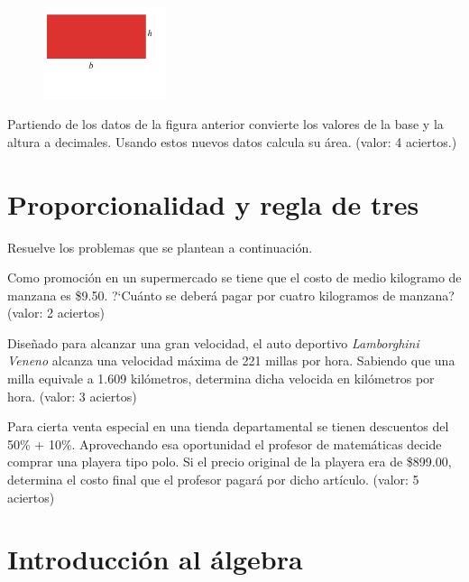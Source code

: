 \documentclass[11pt]{article}
\begin{document}
\begin{figure}[h!]
        \includegraphics[width=0.32\textwidth]{./rectangulo}
    \label{fig:rectangulo}
\end{figure}

\newpage

Partiendo de los datos de la figura anterior convierte los valores de la base y
la altura a decimales. Usando estos nuevos datos calcula su \'area. (valor: 4
aciertos.)

\vspace{5cm}

\section{Proporcionalidad y regla de tres}

Resuelve los problemas que se plantean a continuaci\'on.

\vspace{0.5cm}

Como promoci\'on en un supermercado se tiene que el costo de medio kilogramo de
manzana es \$9.50. ?`Cu\'anto se deber\'a pagar por cuatro kilogramos de
manzana? (valor: 2 aciertos)

\vspace{5cm}

Dise\~nado para alcanzar una gran velocidad,  el auto deportivo
\textit{Lamborghini Veneno} alcanza una velocidad m\'axima de 221 millas por
hora. Sabiendo que una milla equivale a 1.609 kil\'ometros, determina dicha
velocida en kil\'ometros por hora. (valor: 3 aciertos)

\vspace{5cm}

Para cierta venta especial en una tienda departamental se tienen descuentos del
50\% + 10\%. Aprovechando esa oportunidad el profesor de matem\'aticas decide
comprar una playera tipo polo. Si el precio original de la playera era de
\$899.00,  determina el costo final que el profesor pagar\'a por dicho
art\'iculo. (valor: 5 aciertos)

\newpage

\section{Introducci\'on al \'algebra}
\end{document}

